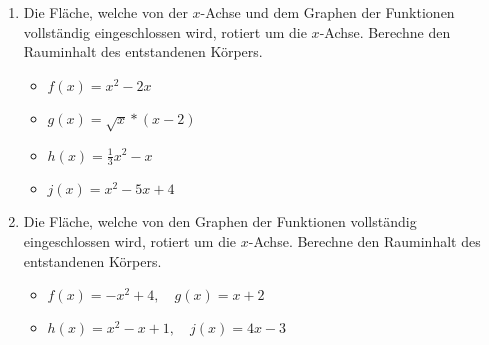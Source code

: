 \begin{enumerate}
  \item Die Fläche, welche von der $x$-Achse und dem Graphen der Funktionen vollständig eingeschlossen wird, rotiert um die $x$-Achse.
  Berechne den Rauminhalt des entstandenen Körpers.
  \begin{multicols}{2}
  \begin{itemize}
    \item $f(x)=x^2-2x$
    \item $g(x)=\sqrt{x}*(x-2)$
    \item $h(x)=\frac 1 3 x^2-x$
    \item $j(x)=x^2-5x+4$
  \end{itemize}
  \end{multicols}
  \item Die Fläche, welche von den Graphen der Funktionen vollständig eingeschlossen wird, rotiert um die $x$-Achse.
  Berechne den Rauminhalt des entstandenen Körpers.
  \begin{itemize}
    \item $f(x)= -x^2+4, \quad g(x)= x+2$
    \item $h(x)= x^2-x+1, \quad j(x)= 4x-3$
  \end{itemize}
\end{enumerate}
